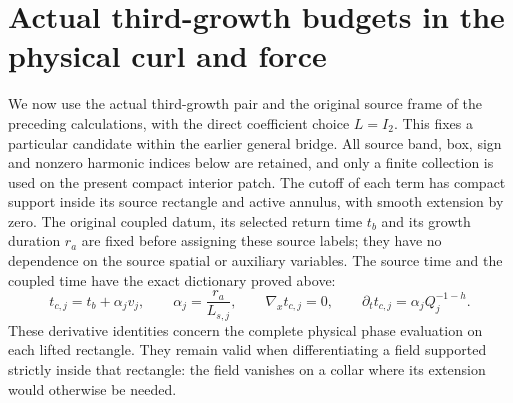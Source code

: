 \documentclass[11pt]{article}
\begin{document}
\section{Actual third-growth budgets in the physical curl and force}
\label{tgq:section}
We now use the actual third-growth pair and the original source frame
of the preceding calculations, with the direct coefficient choice
$L=I_2$. This fixes a particular candidate within the earlier general
bridge. All source band, box, sign and nonzero harmonic indices below
are retained, and only a finite collection is used on the present compact
interior patch. The cutoff of each term has compact support inside its
source rectangle and active annulus, with smooth extension by zero.
The original coupled datum, its selected return time $t_b$ and its
growth duration $r_a$ are fixed before assigning these source labels;
they have no dependence on the source spatial or auxiliary variables.
The source time and the coupled time have the exact dictionary proved
above:
\[
 t_{c,j}=t_b+\alpha_jv_j,\qquad
 \alpha_j=\frac{r_a}{L_{s,j}},\qquad
 \nabla_x t_{c,j}=0,\qquad
 \partial_t t_{c,j}=\alpha_jQ_j^{-1-h}.
\]
These derivative identities concern the complete physical phase
evaluation on each lifted rectangle. They remain valid when differentiating
a field supported strictly inside that rectangle: the field vanishes on
a collar where its extension would otherwise be needed.
\end{document}
